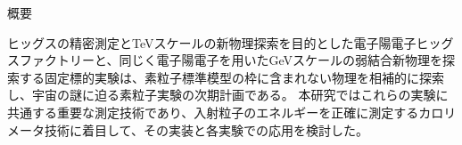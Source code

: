 
\ifabstract
 \maketitle
\fi
\begin{center}
{\huge 概要}\\
\end{center}



ヒッグスの精密測定とTeVスケールの新物理探索を目的とした電子陽電子ヒッグスファクトリーと、同じく電子陽電子を用いたGeVスケールの弱結合新物理を探索する固定標的実験は、素粒子標準模型の枠に含まれない物理を相補的に探索し、宇宙の謎に迫る素粒子実験の次期計画である。
本研究ではこれらの実験に共通する重要な測定技術であり、入射粒子のエネルギーを正確に測定するカロリメータ技術に着目して、その実装と各実験での応用を検討した。

